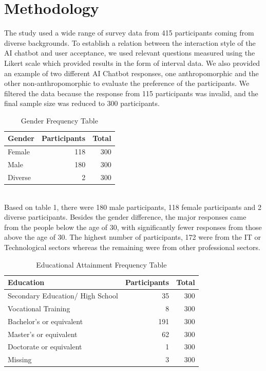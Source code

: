 \documentclass[conference]{IEEEtran}
\begin{document}
\section{Methodology}
The study used a wide range of survey data from 415 participants coming from diverse backgrounds. To establish a relation between the interaction style of the AI chatbot and user acceptance, we used relevant questions measured using the Likert scale which provided results in the form of interval data. We also provided an example of two different AI Chatbot responses, one anthropomorphic and the other non-anthropomorphic to evaluate the preference of the participants. We filtered the data because the response from 115 participants was invalid, and the final sample size was reduced to 300 participants.   
\begin{table}[ht]
    \centering
    \caption{Gender Frequency Table}
    \label{tab:genderTest}
    \begin{tabular}{lrr}
        \toprule
        \textbf{Gender} & \textbf{Participants} & \textbf{Total} \\
        \midrule
        Female & 118 & 300 \\
        Male & 180 & 300 \\
        Diverse & 2 & 300 \\
        \bottomrule
    \end{tabular}
\end{table}
\\

Based on table 1, there were 180 male participants, 118 female participants and 2 diverse participants. Besides the gender difference, the major responses came from the people below the age of 30, with significantly fewer responses from those above the age of 30. The highest number of participants, 172 were from the IT or Technological sectors whereas the remaining were from other professional sectors.

\begin{table}[ht]
    \centering
    \caption{Educational Attainment Frequency Table}
    \label{tab:educationalTest}
    \begin{tabular}{lrr}
        \toprule
        \textbf{Education} & \textbf{Participants} & \textbf{Total} \\
        \midrule
        Secondary Education/ High School & 35 & 300 \\
		Vocational Training & 8 & 300 \\
        Bachelor's or equivalent & 191 & 300 \\
        Master's or equivalent & 62 & 300 \\
		Doctorate or equivalent & 1 & 300 \\
		Missing & 3 & 300 \\
        \bottomrule
    \end{tabular}
\end{table}
\end{document}
